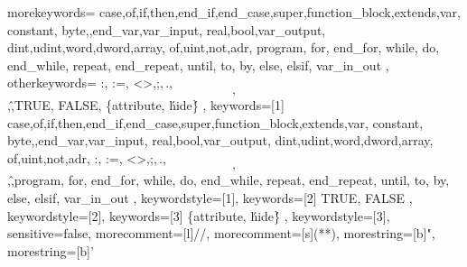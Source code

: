 %
%
{
	morekeywords={
		case,of,if,then,end_if,end_case,super,function_block,extends,var,
		constant, byte,,end_var,var_input, real,bool,var_output,
		dint,udint,word,dword,array, of,uint,not,adr, program, for, end_for, while, do, end_while, repeat, end_repeat, until, to, by, else, elsif, var_in_out
	},
	otherkeywords={
		:, :=, <>,;,\,.,\[,\],\^,TRUE, FALSE, \{attribute,  \'hide\'\}
	},
	keywords=[1]{
		case,of,if,then,end_if,end_case,super,function_block,extends,var,
		constant, byte,,end_var,var_input, real,bool,var_output,
		dint,udint,word,dword,array, of,uint,not,adr, :, :=, <>,;,\,.,\[,\],\^,program, for, end_for, while, do, end_while, repeat, end_repeat, until, to, by, else, elsif, var_in_out
	},
	keywordstyle=[1]\color{blue},
	keywords=[2]{
		TRUE, FALSE
	},
	keywordstyle=[2]\color{stpurple},
	keywords=[3]{
		\{attribute,  \'hide\'\}
	},
	keywordstyle=[3]\color{stgray},
	sensitive=false,
	morecomment=[l]{//}, 
	morecomment=[s]{(*}{*)},
	morestring=[b]{"},
	morestring=[b]{'}
}
%
\lstset{style=CPPStyle}
%
\newcommand*{\mybox}[1]{\textcolor{gray}{\texttt{\framebox{\textcolor{black}{#1}}}}}